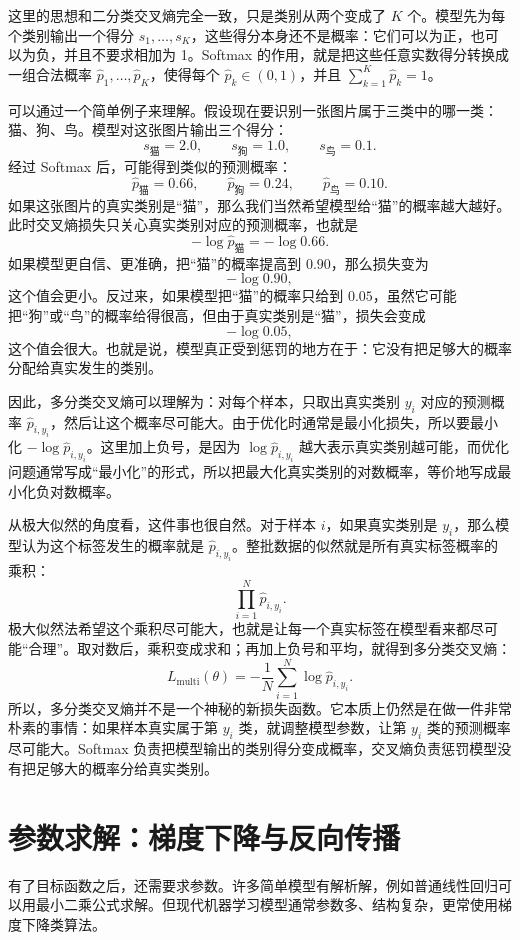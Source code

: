 这里的思想和二分类交叉熵完全一致，只是类别从两个变成了 $K$ 个。模型先为每个类别输出一个得分 $s_1,\ldots,s_K$，这些得分本身还不是概率：它们可以为正，也可以为负，并且不要求相加为 1。Softmax 的作用，就是把这些任意实数得分转换成一组合法概率 $\hat p_1,\ldots,\hat p_K$，使得每个 $\hat p_k\in(0,1)$，并且 $\sum_{k=1}^{K}\hat p_k=1$。

可以通过一个简单例子来理解。假设现在要识别一张图片属于三类中的哪一类：猫、狗、鸟。模型对这张图片输出三个得分：
\[
s_{\text{猫}}=2.0,\qquad
s_{\text{狗}}=1.0,\qquad
s_{\text{鸟}}=0.1.
\]
经过 Softmax 后，可能得到类似的预测概率：
\[
\hat p_{\text{猫}}=0.66,\qquad
\hat p_{\text{狗}}=0.24,\qquad
\hat p_{\text{鸟}}=0.10.
\]
如果这张图片的真实类别是“猫”，那么我们当然希望模型给“猫”的概率越大越好。此时交叉熵损失只关心真实类别对应的预测概率，也就是
\[
-\log \hat p_{\text{猫}}=-\log 0.66.
\]
如果模型更自信、更准确，把“猫”的概率提高到 $0.90$，那么损失变为
\[
-\log 0.90,
\]
这个值会更小。反过来，如果模型把“猫”的概率只给到 $0.05$，虽然它可能把“狗”或“鸟”的概率给得很高，但由于真实类别是“猫”，损失会变成
\[
-\log 0.05,
\]
这个值会很大。也就是说，模型真正受到惩罚的地方在于：它没有把足够大的概率分配给真实发生的类别。

因此，多分类交叉熵可以理解为：对每个样本，只取出真实类别 $y_i$ 对应的预测概率 $\hat p_{i,y_i}$，然后让这个概率尽可能大。由于优化时通常是最小化损失，所以要最小化 $-\log \hat p_{i,y_i}$。这里加上负号，是因为 $\log \hat p_{i,y_i}$ 越大表示真实类别越可能，而优化问题通常写成“最小化”的形式，所以把最大化真实类别的对数概率，等价地写成最小化负对数概率。

从极大似然的角度看，这件事也很自然。对于样本 $i$，如果真实类别是 $y_i$，那么模型认为这个标签发生的概率就是 $\hat p_{i,y_i}$。整批数据的似然就是所有真实标签概率的乘积：
\[
\prod_{i=1}^{N}\hat p_{i,y_i}.
\]
极大似然法希望这个乘积尽可能大，也就是让每一个真实标签在模型看来都尽可能“合理”。取对数后，乘积变成求和；再加上负号和平均，就得到多分类交叉熵：
\[
L_{\mathrm{multi}}(\theta)=
-\frac{1}{N}\sum_{i=1}^{N}\log \hat p_{i,y_i}.
\]
所以，多分类交叉熵并不是一个神秘的新损失函数。它本质上仍然是在做一件非常朴素的事情：如果样本真实属于第 $y_i$ 类，就调整模型参数，让第 $y_i$ 类的预测概率尽可能大。Softmax 负责把模型输出的类别得分变成概率，交叉熵负责惩罚模型没有把足够大的概率分给真实类别。

\section{参数求解：梯度下降与反向传播}

有了目标函数之后，还需要求参数。许多简单模型有解析解，例如普通线性回归可以用最小二乘公式求解。但现代机器学习模型通常参数多、结构复杂，更常使用梯度下降类算法。

